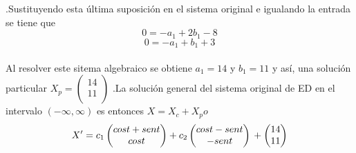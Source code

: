 \documentclass[11.5pt]{article}
\begin{document}
.Sustituyendo esta última suposición en el sistema original e igualando la entrada se tiene que \\
$$0=-a_1+2b_1-8$$
$$0=-a_1+b_1+3$$\\
Al resolver este sitema algebraico se obtiene $a_1=14 $ y $  b_1 =11$ y así, una solución particular 
$X_p=\begin{pmatrix}
14\\
11\\
\end{pmatrix}$
.La solución general del sistema original de ED en el intervalo $(-\infty,\infty)$ es entonces $ X=X_c+X_p o$
$$
\left.
X'=c_1\begin{pmatrix}
cost+sent\\
cost\\
\end{pmatrix}
 +c_2
\begin{pmatrix}
cost-sent\\ 
-sent\\  
\end{pmatrix}\\
+
\begin{pmatrix}
14\\
11\\
\end{pmatrix}
\right.
$$
\pagebreak
\end{document}
